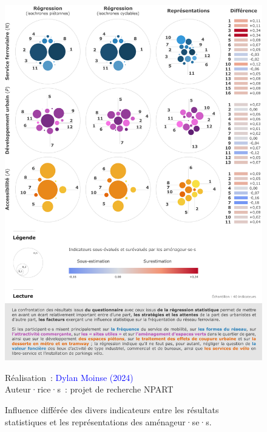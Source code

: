 \begin{refsegment}
    \begin{figure}[h!]\vspace*{4pt}
        \caption{Influence différée des divers indicateurs entre les résultats statistiques et les représentations des aménageur·se·s.}
        \label{fig-chap6:ecarts-representation-indicateurs}
        \centerline{\includegraphics[width=1\columnwidth]{src/Figures/Chap-6/FR_NPART_Confrontation_Poids_Indicateurs.pdf}}
        \vspace{5pt}
        \begin{flushright}\scriptsize{
        Réalisation~: \textcolor{blue}{Dylan Moinse (2024)}
        \\
        Auteur·rice·s~: projet de recherche \acrshort{NPART}
        }\end{flushright}
    \end{figure}


\end{refsegment}
